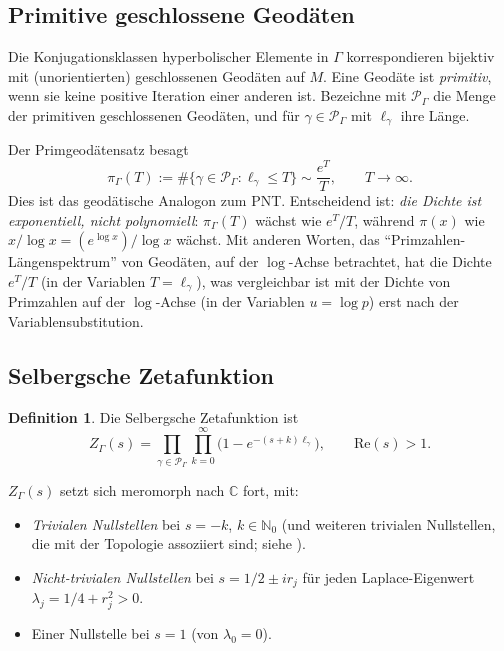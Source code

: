 \documentclass[12pt,a4paper]{article}
\theoremstyle{definition}
\newtheorem{definition}[theorem]{Definition}
\theoremstyle{remark}
\newcommand{\CC}{\mathbb{C}}
\newcommand{\NN}{\mathbb{N}}
\newcommand{\Sel}{Z_{\Gamma}}
\begin{document}
\subsection{Primitive geschlossene Geodäten}

Die Konjugationsklassen hyperbolischer Elemente in $\Gamma$ korrespondieren bijektiv
mit (unorientierten) geschlossenen Geodäten auf $M$. Eine Geodäte ist \emph{primitiv}, wenn sie
keine positive Iteration einer anderen ist. Bezeichne mit $\mathcal{P}_\Gamma$ die Menge
der primitiven geschlossenen Geodäten, und für $\gamma \in \mathcal{P}_\Gamma$ mit
$\ell_\gamma$ ihre Länge.

Der Primgeodätensatz \cite{Huber1959, Sarnak1981} besagt
\begin{equation}
\label{eq:PGT}
\pi_\Gamma(T) := \#\{\gamma \in \mathcal{P}_\Gamma : \ell_\gamma \le T\} \sim \frac{e^T}{T},\qquad T \to \infty.
\end{equation}
Dies ist das geodätische Analogon zum PNT. Entscheidend ist: \emph{die Dichte ist
exponentiell, nicht polynomiell}: $\pi_\Gamma(T)$ wächst wie $e^T/T$, während
$\pi(x)$ wie $x/\log x = (e^{\log x})/\log x$ wächst. Mit anderen Worten, das
``Primzahlen-Längenspektrum'' von Geodäten, auf der $\log$-Achse betrachtet, hat die Dichte
$e^T/T$ (in der Variablen $T = \ell_\gamma$), was vergleichbar ist mit der Dichte von
Primzahlen auf der $\log$-Achse (in der Variablen $u = \log p$) erst nach der
Variablensubstitution.

\subsection{Selbergsche Zetafunktion}

\begin{definition}
\label{def:Selberg-zeta}
Die Selbergsche Zetafunktion ist
\begin{equation}
\label{eq:Sel-def}
\Sel(s) = \prod_{\gamma \in \mathcal{P}_\Gamma}\prod_{k=0}^\infty \bigl(1 - e^{-(s+k)\ell_\gamma}\bigr),\qquad \mathrm{Re}(s) > 1.
\end{equation}
\end{definition}

$\Sel(s)$ setzt sich meromorph nach $\CC$ fort, mit:

\begin{itemize}
\item \emph{Trivialen Nullstellen} bei $s = -k$, $k \in \NN_0$ (und weiteren trivialen Nullstellen,
die mit der Topologie assoziiert sind; siehe \cite{Hejhal1976}).
\item \emph{Nicht-trivialen Nullstellen} bei $s = 1/2 \pm ir_j$ für jeden
Laplace-Eigenwert $\lambda_j = 1/4 + r_j^2 > 0$.
\item Einer Nullstelle bei $s = 1$ (von $\lambda_0 = 0$).
\end{itemize}
\end{document}
